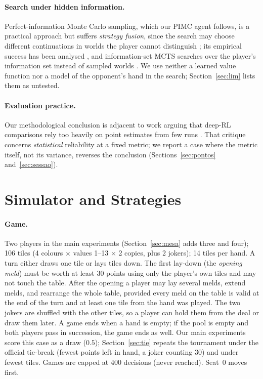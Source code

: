 \documentclass[11pt]{article}
\begin{document}
\paragraph{Search under hidden information.} Perfect-information Monte Carlo sampling, which our PIMC agent follows, is a practical approach but suffers \emph{strategy fusion}, since the search may choose different continuations in worlds the player cannot distinguish \cite{frank1998}; its empirical success has been analysed \cite{long2010}, and information-set MCTS searches over the player's information set instead of sampled worlds \cite{cowling2012}. We use neither a learned value function nor a model of the opponent's hand in the search; Section~\ref{sec:lim} lists them as untested.
\paragraph{Evaluation practice.} Our methodological conclusion is adjacent to work arguing that deep-RL comparisons rely too heavily on point estimates from few runs \cite{agarwal2021}. That critique concerns \emph{statistical} reliability at a fixed metric; we report a case where the metric itself, not its variance, reverses the conclusion (Sections~\ref{sec:pontos} and~\ref{sec:sessao}).

\section{Simulator and Strategies}
\paragraph{Game.} Two players in the main experiments (Section~\ref{sec:mesa} adds three and four); 106 tiles (4 colours $\times$ values 1--13 $\times$ 2 copies, plus 2 jokers); 14 tiles per hand. A turn either draws one tile or lays tiles down. The first lay-down (the \emph{opening meld}) must be worth at least 30 points using only the player's own tiles and may not touch the table. After the opening a player may lay several melds, extend melds, and rearrange the whole table, provided every meld on the table is valid at the end of the turn and at least one tile from the hand was played. The two jokers are shuffled with the other tiles, so a player can hold them from the deal or draw them later. A game ends when a hand is empty; if the pool is empty and both players pass in succession, the game ends as well. Our main experiments score this case as a draw ($0.5$); Section~\ref{sec:tie} repeats the tournament under the official tie-break (fewest points left in hand, a joker counting $30$) and under fewest tiles. Games are capped at 400 decisions (never reached). Seat~0 moves first.
\end{document}
